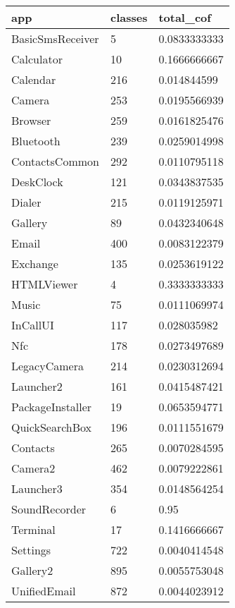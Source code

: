 \begin{tabular}{|l|l|l|}
\hline
app&classes&total\_cof\\
\hline
BasicSmsReceiver&5&0.0833333333\\
\hline
Calculator&10&0.1666666667\\
\hline
Calendar&216&0.014844599\\
\hline
Camera&253&0.0195566939\\
\hline
Browser&259&0.0161825476\\
\hline
Bluetooth&239&0.0259014998\\
\hline
ContactsCommon&292&0.0110795118\\
\hline
DeskClock&121&0.0343837535\\
\hline
Dialer&215&0.0119125971\\
\hline
Gallery&89&0.0432340648\\
\hline
Email&400&0.0083122379\\
\hline
Exchange&135&0.0253619122\\
\hline
HTMLViewer&4&0.3333333333\\
\hline
Music&75&0.0111069974\\
\hline
InCallUI&117&0.028035982\\
\hline
Nfc&178&0.0273497689\\
\hline
LegacyCamera&214&0.0230312694\\
\hline
Launcher2&161&0.0415487421\\
\hline
PackageInstaller&19&0.0653594771\\
\hline
QuickSearchBox&196&0.0111551679\\
\hline
Contacts&265&0.0070284595\\
\hline
Camera2&462&0.0079222861\\
\hline
Launcher3&354&0.0148564254\\
\hline
SoundRecorder&6&0.95\\
\hline
Terminal&17&0.1416666667\\
\hline
Settings&722&0.0040414548\\
\hline
Gallery2&895&0.0055753048\\
\hline
UnifiedEmail&872&0.0044023912\\
\hline
\end{tabular}
